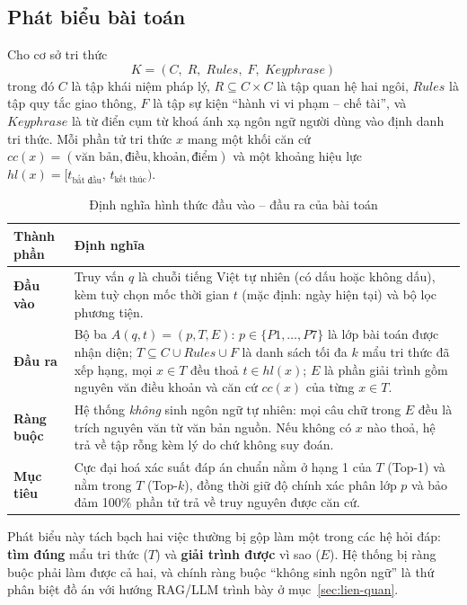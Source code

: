 \subsection{Phát biểu bài toán}
\label{sec:phat-bieu}

Cho cơ sở tri thức
\begin{equation}
  K = (C,\; R,\; \mathit{Rules},\; F,\; \mathit{Keyphrase})
  \label{eq:K}
\end{equation}
trong đó $C$ là tập khái niệm pháp lý, $R \subseteq C \times C$ là tập quan hệ hai ngôi,
$\mathit{Rules}$ là tập quy tắc giao thông, $F$ là tập sự kiện ``hành vi vi phạm -- chế
tài'', và $\mathit{Keyphrase}$ là từ điển cụm từ khoá ánh xạ ngôn ngữ người dùng vào định
danh tri thức. Mỗi phần tử tri thức $x$ mang một khối căn cứ
$cc(x) = (\text{văn bản}, \text{điều}, \text{khoản}, \text{điểm})$ và một khoảng hiệu lực
$hl(x) = [t_{\text{bắt đầu}},\, t_{\text{kết thúc}})$.

\begin{table}[H]
\centering
\caption{Định nghĩa hình thức đầu vào -- đầu ra của bài toán}
\label{tab:io}
\renewcommand{\arraystretch}{1.3}
\begin{tabularx}{\textwidth}{@{}>{\bfseries}p{2.7cm} L@{}}
\toprule
Thành phần & \textbf{Định nghĩa} \\
\midrule
Đầu vào & Truy vấn $q$ là chuỗi tiếng Việt tự nhiên (có dấu hoặc không dấu), kèm tuỳ chọn
mốc thời gian $t$ (mặc định: ngày hiện tại) và bộ lọc phương tiện. \\
Đầu ra & Bộ ba $A(q,t) = (p, T, E)$: $p \in \{P1,\dots,P7\}$ là lớp bài toán được nhận
diện; $T \subseteq C \cup \mathit{Rules} \cup F$ là danh sách tối đa $k$ mẩu tri thức đã
xếp hạng, mọi $x \in T$ đều thoả $t \in hl(x)$; $E$ là phần giải trình gồm nguyên văn điều
khoản và căn cứ $cc(x)$ của từng $x \in T$. \\
Ràng buộc & Hệ thống \emph{không} sinh ngôn ngữ tự nhiên: mọi câu chữ trong $E$ đều là
trích nguyên văn từ văn bản nguồn. Nếu không có $x$ nào thoả, hệ trả về tập rỗng kèm lý do
chứ không suy đoán. \\
Mục tiêu & Cực đại hoá xác suất đáp án chuẩn nằm ở hạng 1 của $T$ (Top-1) và nằm trong $T$
(Top-$k$), đồng thời giữ độ chính xác phân lớp $p$ và bảo đảm 100\% phần tử trả về truy
nguyên được căn cứ. \\
\bottomrule
\end{tabularx}
\end{table}

Phát biểu này tách bạch hai việc thường bị gộp làm một trong các hệ hỏi đáp: \textbf{tìm
đúng} mẩu tri thức ($T$) và \textbf{giải trình được} vì sao ($E$). Hệ thống bị ràng buộc
phải làm được cả hai, và chính ràng buộc ``không sinh ngôn ngữ'' là thứ phân biệt đồ án với
hướng RAG/LLM trình bày ở mục~\ref{sec:lien-quan}.

